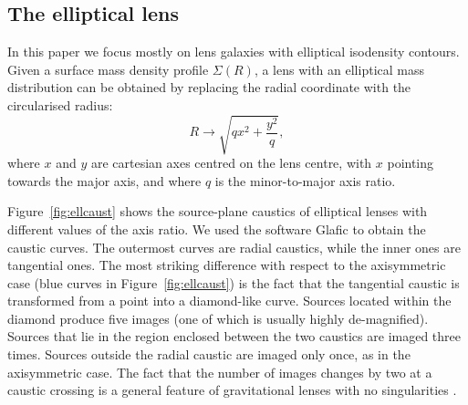 \documentclass{aa}
\def\Fref#1{Figure~\ref{#1}\xspace}
\begin{document}

\subsection{The elliptical lens}

In this paper we focus mostly on lens galaxies with elliptical isodensity contours.
Given a surface mass density profile $\Sigma(R)$, a lens with an elliptical mass distribution can be obtained by replacing the radial coordinate with the circularised radius:
\begin{equation}\label{eq:elltransf}
R \rightarrow \sqrt{qx^2 + \frac{y^2}{q}},
\end{equation}
where $x$ and $y$ are cartesian axes centred on the lens centre, with $x$ pointing towards the major axis, and where $q$ is the minor-to-major axis ratio.

\Fref{fig:ellcaust} shows the source-plane caustics of elliptical lenses with different values of the axis ratio. We used the software {\sc Glafic} \citep{Ogu21} to obtain the caustic curves.
The outermost curves are radial caustics, while the inner ones are tangential ones.
The most striking difference with respect to the axisymmetric case (blue curves in \Fref{fig:ellcaust}) is the fact that the tangential caustic is transformed from a point into a diamond-like curve.
Sources located within the diamond produce five images (one of which is usually highly de-magnified). Sources that lie in the region enclosed between the two caustics are imaged three times. Sources outside the radial caustic are imaged only once, as in the axisymmetric case.
The fact that the number of images changes by two at a caustic crossing is a general feature of gravitational lenses with no singularities \citep{SEF92}.
\end{document}
